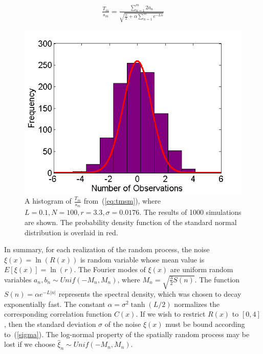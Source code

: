 \begin{align}\label{eq:tmsm}
\frac{T_m}{s_m} = \frac{\sum_{n=1}^{m} 2a_n}{\sqrt{\frac{\alpha}{2} +\alpha\sum_{n=1}^m e^{-Ln}}} 
\end{align}
\begin{figure}[!h]
\caption[A histogram of $\frac{T_m}{s_m}$]{A histogram of
  $\frac{T_m}{s_m}$ from~(\ref{eq:tmsm}), where $L=0.1,N = 100, r =
  3.3, \sigma=0.0176$. The results of 1000 simulations are shown. The probability
  density function of the standard normal distribution is
overlaid in red.}\label{fig:tmsm}
	\begin{center}
		\includegraphics[scale=0.6]{figs/tmsm.png}
	\end{center}
\end{figure}

In summary, for each realization of the random process, the noise
$\xi(x)=\ln(R(x))$ is random variable whose mean value is
$E[\xi(x)]=\ln(r)$. The Fourier modes of $\xi(x)$ are uniform random
variables $a_n,b_n \sim Unif(-M_n,M_n)$, where $M_n=
\sqrt{\frac{3}{2}S(n)}$. The function $S(n)=\alpha e^{-L|n|}$
represents the spectral density, which was chosen to decay exponentially fast. The constant $\alpha = \sigma^2 \tanh(L/2)$ normalizes the corresponding
correlation function $C(x)$. If we wish to restrict $R(x)$
to $[0,4]$, then the standard deviation $\sigma$ of
the noise $\xi(x)$ must be bound according to~(\ref{sigma}). The
log-normal property of the spatially random process may be lost if we
choose $\hat{\xi}_n \sim Unif(-M_n,M_n)$.  

